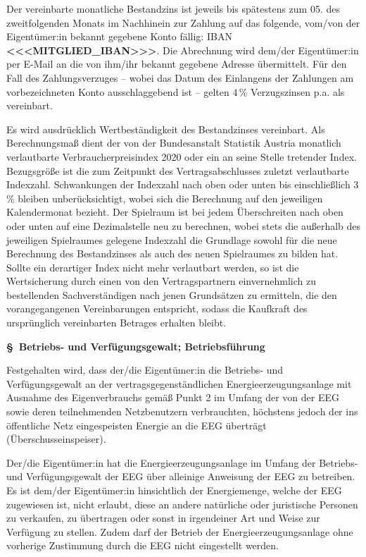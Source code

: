 \documentclass[a4paper,11pt]{article}
\newcounter{parasec}
\newcounter{parasubsec}[parasec]
\newcommand{\parasec}[1]{%
  \stepcounter{parasec}%
  \setcounter{parasubsec}{0}%
  \par\Needspace*{5\baselineskip}%
  \bigskip
  {\large\bfseries\color{tuerkis}\S\ \theparasec\quad #1}\par\nopagebreak
  \smallskip\nopagebreak
}
\begin{document}
Der vereinbarte monatliche Bestandzins ist jeweils bis spätestens zum 05. des zweitfolgenden Monats im Nachhinein zur Zahlung auf das folgende, vom/von der Eigentümer:in bekannt gegebene Konto fällig: IBAN \textbf{<<<MITGLIED_IBAN>>>}. Die Abrechnung wird dem/der Eigentümer:in per E-Mail an die von ihm/ihr bekannt gegebene Adresse übermittelt. Für den Fall des Zahlungsverzuges -- wobei das Datum des Einlangens der Zahlungen am vorbezeichneten Konto ausschlaggebend ist -- gelten 4\,\% Verzugszinsen p.a. als vereinbart.

Es wird ausdrücklich Wertbeständigkeit des Bestandzinses vereinbart. Als Berechnungsmaß dient der von der Bundesanstalt Statistik Austria monatlich verlautbarte Verbraucherpreisindex 2020 oder ein an seine Stelle tretender Index. Bezugsgröße ist die zum Zeitpunkt des Vertragsabschlusses zuletzt verlautbarte Indexzahl. Schwankungen der Indexzahl nach oben oder unten bis einschließlich 3\,\% bleiben unberücksichtigt, wobei sich die Berechnung auf den jeweiligen Kalendermonat bezieht. Der Spielraum ist bei jedem Überschreiten nach oben oder unten auf eine Dezimalstelle neu zu berechnen, wobei stets die außerhalb des jeweiligen Spielraumes gelegene Indexzahl die Grundlage sowohl für die neue Berechnung des Bestandzinses als auch des neuen Spielraumes zu bilden hat. Sollte ein derartiger Index nicht mehr verlautbart werden, so ist die Wertsicherung durch einen von den Vertragspartnern einvernehmlich zu bestellenden Sachverständigen nach jenen Grundsätzen zu ermitteln, die den vorangegangenen Vereinbarungen entspricht, sodass die Kaufkraft des ursprünglich vereinbarten Betrages erhalten bleibt.

\parasec{Betriebs- und Verfügungsgewalt; Betriebsführung}

Festgehalten wird, dass der/die Eigentümer:in die Betriebs- und Verfügungsgewalt an der vertragsgegenständlichen Energieerzeugungsanlage mit Ausnahme des Eigenverbrauchs gemäß Punkt 2 im Umfang der von der EEG sowie deren teilnehmenden Netzbenutzern verbrauchten, höchstens jedoch der ins öffentliche Netz eingespeisten Energie an die EEG überträgt (Überschusseinspeiser).

Der/die Eigentümer:in hat die Energieerzeugungsanlage im Umfang der Betriebs- und Verfügungsgewalt der EEG über alleinige Anweisung der EEG zu betreiben. Es ist dem/der Eigentümer:in hinsichtlich der Energiemenge, welche der EEG zugewiesen ist, nicht erlaubt, diese an andere natürliche oder juristische Personen zu verkaufen, zu übertragen oder sonst in irgendeiner Art und Weise zur Verfügung zu stellen. Zudem darf der Betrieb der Energieerzeugungsanlage ohne vorherige Zustimmung durch die EEG nicht eingestellt werden.
\end{document}
